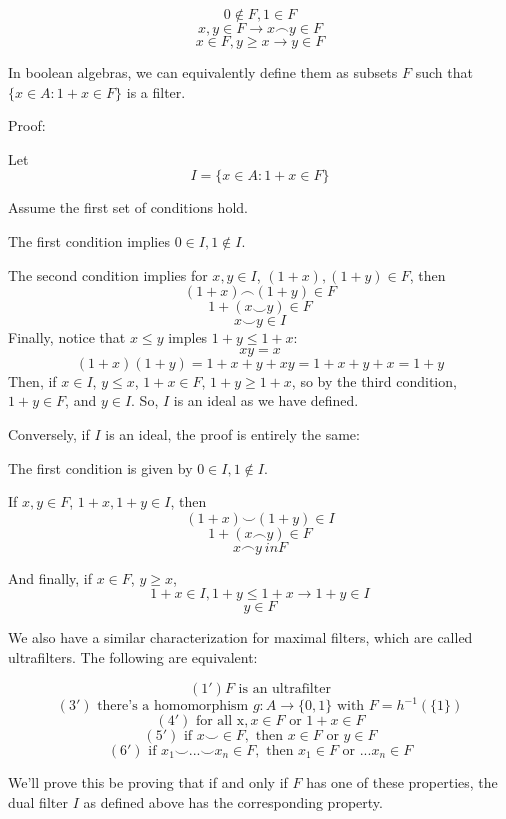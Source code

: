 \documentclass{article}
\begin{document}
      \[0 \notin F, 1 \in F\]
      \[x, y \in F \rightarrow x \frown y \in F\]
      \[x \in F, y \geq x \rightarrow y \in F\]

      In boolean
      algebras, we can equivalently define them as subsets $F$ such that $\{x
      \in A: 1+x \in F\}$ is a filter.

      Proof:

      Let
      \[I = \{x \in A: 1+x \in F\}\]


      Assume the first set of conditions hold.

      The first condition implies $0 \in I, 1 \notin I$.

      The second condition implies for $x, y \in I$, $(1+x), (1+y) \in F$, then
      \[(1+x) \frown (1+y) \in F\]
      \[1 + (x \smile y) \in F\]
      \[x \smile y \in I\]
      Finally, notice that $x \leq y$ imples $1+y \leq 1+x$:
      \[xy = x\]
      \[(1+x)(1+y) = 1 + x + y + xy = 1 + x + y + x = 1 + y\]
      Then, if $x \in I$, $y \leq x$, $1+x \in F$, $1+y \geq 1+x$, so by the
      third condition, $1+y \in F$, and $y \in I$.
      So, $I$ is an ideal as we have defined.

      Conversely, if $I$ is an ideal, the proof is entirely the same:
      
      The first condition is given by $0 \in I, 1 \notin I$.

      If $x, y \in F$, $1+x, 1+y \in I$, then
      \[(1+x) \smile (1+y) \in I\]
      \[1 + (x \frown y) \in F\]
      \[x \frown y \ in F\]

      And finally, if $x \in F$, $y \geq x$,
      \[1+x \in I, 1+y \leq 1+x \rightarrow 1+y \in I\]
      \[y \in F\]

      We also have a similar characterization for maximal filters, which are
      called ultrafilters. The following are equivalent:

      \[(1') F \text{ is an ultrafilter}\]
      \[(3') \text{ there's a homomorphism } g: A \rightarrow \{0,1\} \text{ with }
      F = h^{-1}(\{1\})\]
      \[(4') \text{ for all x}, x \in F \text{ or } 1+x \in F\]
      \[(5') \text{ if } x \smile \in F, \text{ then } x \in F \text{ or } y \in
      F\]
      \[(6') \text{ if } x_1 \smile ... \smile x_n \in F, \text{ then } x_1 \in
      F \text{ or } ... x_n \in F\]

      We'll prove this be proving that if and only if $F$ has one of these
      properties, the dual filter $I$ as defined above has the corresponding
      property.
\end{document}
